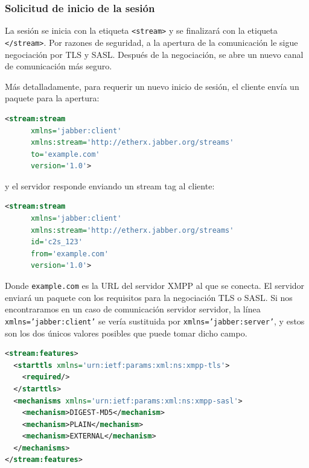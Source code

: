 \documentclass[a4paper, 11pt]{article} %
\begin{document}
    \subsubsection{Solicitud de inicio de la sesión}
      La sesión se inicia con la etiqueta \texttt{<stream>} y se finalizará con la etiqueta
      \texttt{</stream>}. Por razones de seguridad, a la apertura de la comunicación le sigue
      negociación por TLS y SASL. Después de la negociación, se abre un nuevo canal de comunicación
      más seguro.
      
      Más detalladamente, para requerir un nuevo inicio de sesión, el cliente envía un paquete para la apertura:
      \begin{lstlisting}[language=XML] 
<stream:stream 
	  xmlns='jabber:client'
	  xmlns:stream='http://etherx.jabber.org/streams'
	  to='example.com' 
	  version='1.0'>
      \end{lstlisting}
      y el servidor responde enviando un stream tag al cliente:
      \begin{lstlisting}[language=XML] 
<stream:stream
	  xmlns='jabber:client'
	  xmlns:stream='http://etherx.jabber.org/streams'
	  id='c2s_123'
	  from='example.com'
	  version='1.0'>
      \end{lstlisting}    
      Donde \texttt{example.com} es la URL del servidor XMPP al que se conecta. El servidor
      enviará un paquete con los requisitos para la negociación TLS o SASL. Si nos encontraramos en un caso de 
      comunicación servidor servidor, la línea \texttt{xmlns='jabber:client'} se vería sustituida por 
      \texttt{xmlns='jabber:server'}, y estos son los dos únicos valores posibles que puede tomar dicho campo.
      \begin{lstlisting}[language=XML]
<stream:features> 
  <starttls xmlns='urn:ietf:params:xml:ns:xmpp-tls'>    
    <required/>  
  </starttls>  
  <mechanisms xmlns='urn:ietf:params:xml:ns:xmpp-sasl'>    
    <mechanism>DIGEST-MD5</mechanism>    
    <mechanism>PLAIN</mechanism>   
    <mechanism>EXTERNAL</mechanism>  
  </mechanisms> 
</stream:features>
      \end{lstlisting}
\end{document}
